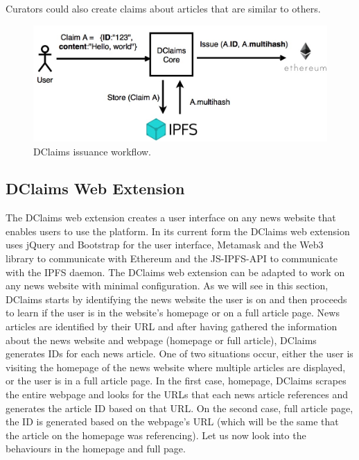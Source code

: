 Curators could also create claims about articles that are similar to others.


\begin{figure}[t]
  \centering
  \includegraphics[width=0.8\columnwidth]{figures/arch2.jpg}
  \caption{DClaims issuance workflow.}
  \label{fig:arch2}
\end{figure}

\subsection{DClaims Web Extension}
The DClaims web extension creates a user interface on any news website that enables users to use the platform.
In its current form the DClaims web extension uses jQuery and Bootstrap for the user interface, Metamask and the Web3 library to communicate with Ethereum and the JS-IPFS-API to communicate with the IPFS daemon.
The DClaims web extension can be adapted to work on any news website with minimal configuration. As we will see in this section, DClaims starts by identifying the news website the user is on and then proceeds to learn if the user is in the website’s homepage or on a full article page.
News articles are identified by their URL and after having gathered the information about the news website and webpage (homepage or full article), DClaims generates IDs for each news article. One of two situations occur, either the user is visiting the homepage of the news website where multiple articles are displayed, or the user is in a full article page. In the first case, homepage, DClaims scrapes the entire webpage and looks for the URLs that each news article references and generates the article ID based on that URL. On the second case, full article page, the ID is generated based on the webpage’s URL (which will be the same that the article on the homepage was referencing). Let us now look into the behaviours in the homepage and full page.

